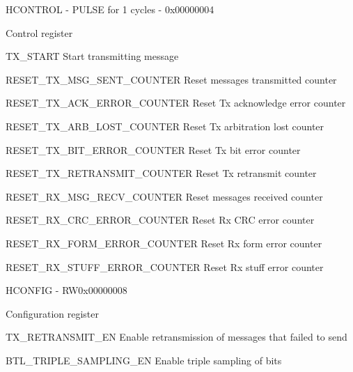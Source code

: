 \documentclass{article}
\begin{document}
\begin{register}{H}{CONTROL - PULSE for 1 cycles - }{0x00000004}  \par Control register \regnewline
  \label{CONTROL}
\regnewline
  \begin{regdesc}\begin{reglist}
    \item [TX{\_}START] Start transmitting message    \item [RESET{\_}TX{\_}MSG{\_}SENT{\_}COUNTER] Reset messages transmitted counter    \item [RESET{\_}TX{\_}ACK{\_}ERROR{\_}COUNTER] Reset Tx acknowledge error counter    \item [RESET{\_}TX{\_}ARB{\_}LOST{\_}COUNTER] Reset Tx arbitration lost counter    \item [RESET{\_}TX{\_}BIT{\_}ERROR{\_}COUNTER] Reset Tx bit error counter    \item [RESET{\_}TX{\_}RETRANSMIT{\_}COUNTER] Reset Tx retransmit counter    \item [RESET{\_}RX{\_}MSG{\_}RECV{\_}COUNTER] Reset messages received counter    \item [RESET{\_}RX{\_}CRC{\_}ERROR{\_}COUNTER] Reset Rx CRC error counter    \item [RESET{\_}RX{\_}FORM{\_}ERROR{\_}COUNTER] Reset Rx form error counter    \item [RESET{\_}RX{\_}STUFF{\_}ERROR{\_}COUNTER] Reset Rx stuff error counter  \end{reglist}\end{regdesc}
\end{register}

\begin{register}{H}{CONFIG - RW}{0x00000008}  \par Configuration register \regnewline
  \label{CONFIG}
\regnewline
  \begin{regdesc}\begin{reglist}
    \item [TX{\_}RETRANSMIT{\_}EN] Enable retransmission of messages that failed to send    \item [BTL{\_}TRIPLE{\_}SAMPLING{\_}EN] Enable triple sampling of bits  \end{reglist}\end{regdesc}
\end{register}
\end{document}
